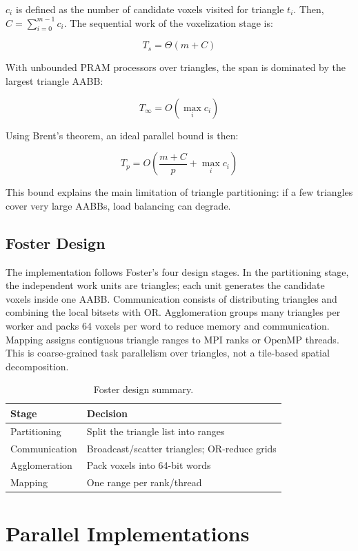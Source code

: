 \documentclass[conference]{IEEEtran}
\begin{document}
$c_i$ is defined as the number of candidate voxels visited for triangle $t_i$. Then,
$C=\sum_{i=0}^{m-1} c_i$. The sequential work of the voxelization stage is:

\[
  T_s = \Theta(m + C)
\]

With unbounded PRAM processors over triangles, the span is dominated by the
largest triangle AABB:\@

\[
  T_{\infty} = O(\max_i c_i)
\]

Using Brent's theorem, an ideal parallel bound is then:

\[
  T_p = O\left(\frac{m+C}{p} + \max_i c_i\right)
\]

This bound explains the main limitation of triangle partitioning: if a few
triangles cover very large AABBs, load balancing can degrade.

\subsection{Foster Design}

The implementation follows Foster's four design stages. In the partitioning
stage, the independent work units are triangles; each unit generates the
candidate voxels inside one AABB. Communication consists of distributing
triangles and combining the local bitsets with OR. Agglomeration groups many
triangles per worker and packs 64 voxels per word to reduce memory and
communication. Mapping assigns contiguous triangle ranges to MPI ranks or
OpenMP threads. This is coarse-grained task parallelism over triangles, not a
tile-based spatial decomposition.

\begin{table}[t]
  \centering
  \caption{Foster design summary.}
  \begin{tabular}{ll}
    \toprule
    Stage         & Decision                                     \\
    \midrule
    Partitioning  & Split the triangle list into ranges          \\
    Communication & Broadcast/scatter triangles; OR-reduce grids \\
    Agglomeration & Pack voxels into 64-bit words                \\
    Mapping       & One range per rank/thread                    \\
    \bottomrule
  \end{tabular}
\end{table}

\section{Parallel Implementations}
\end{document}
